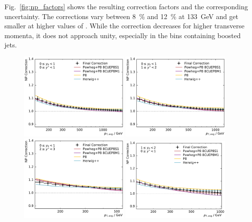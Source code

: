 Fig.~\ref{fig:np_factors} shows the resulting correction factors and the
corresponding uncertainty. The corrections vary between \SI{8}{\percent} and
\SI{12}{\percent} at
\SI{133}{\GeV} and get smaller at higher values of \ptavg. While the correction
decreases for higher transverse momenta, it does not approach unity, especially
in the bins containing boosted jets. 

\begin{figure}[htp]
    \centering
    \includegraphics[width=0.48\textwidth]{figures/theory/np_factors_nlo_final_yb0ys0.pdf}\hfill
    \includegraphics[width=0.48\textwidth]{figures/theory/np_factors_nlo_final_yb0ys1.pdf}
    \includegraphics[width=0.48\textwidth]{figures/theory/np_factors_nlo_final_yb0ys2.pdf}\hfill
    \includegraphics[width=0.48\textwidth]{figures/theory/np_factors_nlo_final_yb1ys0.pdf}

\end{figure}
